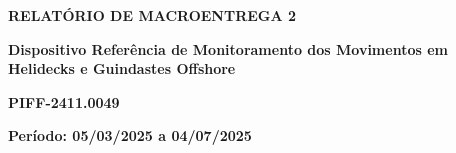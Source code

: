 \begin{center}
    \LARGE
    \textbf{RELATÓRIO DE MACROENTREGA 2}

    \vspace{0.6cm}
    \normalsize

    \begin{minipage}{.90\linewidth}
        \centering
        \textbf{
            Dispositivo Referência de Monitoramento dos Movimentos em Helidecks e Guindastes Offshore
        }
    
        \vspace{.6cm}
        \textbf{PIFF-2411.0049}
        \normalsize
    \end{minipage}
    
    \vspace{1.2cm}
    
    \begin{flushleft}
     \phantom{a.}\textbf{Período: 05/03/2025 a 04/07/2025}
    \end{flushleft}
    

\end{center}
